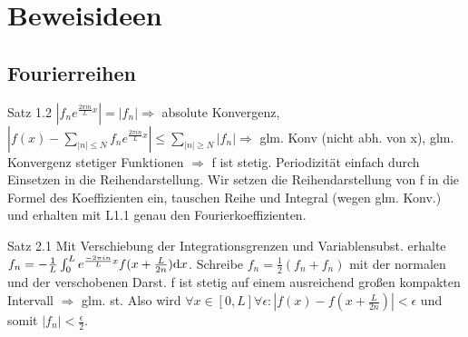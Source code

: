 \chapter{Beweisideen}

\section{Fourierreihen}


\begin{namedtheorem}{Satz 1.2}
$|f_ne^{\frac{2\pi in}{L}x}|=|f_n| \Rightarrow$ absolute Konvergenz, $|f(x) - \sum_{|n|\leq N}f_n e^{\frac{2\pi in}{L}x}| \leq \sum_{|n|\geq N}|f_n|\Rightarrow$ glm. Konv (nicht abh. von x), glm. Konvergenz stetiger Funktionen $\Rightarrow$ f ist stetig. Periodizität einfach durch Einsetzen in die Reihendarstellung. Wir setzen die Reihendarstellung von f in die Formel des Koeffizienten ein, tauschen Reihe und Integral (wegen glm. Konv.) und erhalten mit L1.1 genau den Fourierkoeffizienten.
\end{namedtheorem}

\begin{namedtheorem}{Satz 2.1}
Mit Verschiebung der Integrationsgrenzen und Variablensubst. erhalte
$f_n = -\frac{1}{L} \int_{0}^{L}e^{\frac{-2\pi in}{L}x}f(x+\frac{L}{2n})\mathrm{d}x$. Schreibe $f_n = \frac{1}{2}(f_n + f_n)$ mit der normalen und der verschobenen Darst. f ist stetig auf einem ausreichend großen kompakten Intervall $\Rightarrow$ glm. st. Also wird $\forall x\in [0,L] \forall \epsilon: |f(x)-f(x+\frac{L}{2n})|<\epsilon$ und somit $|f_n| < \frac{\epsilon}{2}$. 
\end{namedtheorem}